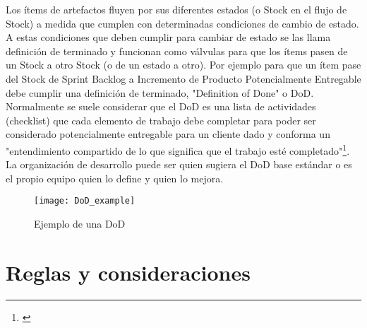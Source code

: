 Los ítems de artefactos fluyen por sus diferentes estados (o Stock en el flujo de Stock) a medida que cumplen con determinadas condiciones de cambio de estado. A estas condiciones que deben cumplir para cambiar de estado se las llama definición de terminado y funcionan como válvulas para que los ítems pasen de un Stock a otro Stock (o de un estado a otro). Por ejemplo para que un ítem pase del Stock de Sprint Backlog a Incremento de Producto Potencialmente Entregable debe cumplir una definición de terminado, "Definition of Done" o DoD. Normalmente se suele considerar que el DoD es una lista de actividades (checklist) que cada elemento de trabajo debe completar para poder ser considerado potencialmente entregable para un cliente dado y conforma un "entendimiento compartido de lo que significa que el trabajo esté completado"\footnote{\cite{Ken-Jeff-2013}}. La organización de desarrollo puede ser quien sugiera el DoD base estándar o es el propio equipo quien lo define y quien lo mejora.

\begin{figure}[h]
  \centering
  \texttt{[image: DoD\_example]}
  \caption{Ejemplo de una DoD}
  \centering
  \label{fig:DoD_example} 
\end{figure}
\FloatBarrier

\section{Reglas y consideraciones}

